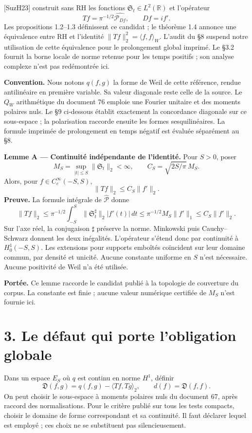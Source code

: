 \documentclass[
  11pt,
]{article}
\begin{document}
{[}SuzH23{]} construit sans RH les fonctions
\(\mathfrak S_t\in L^2(\mathbb R)\) et l'opérateur \[
T f=\pi^{-1/2}\widehat{\mathcal P_{Df}},\qquad Df=if'.
\] Les propositions 1.2--1.3 définissent ce candidat ; le théorème 1.4
annonce une équivalence entre RH et l'identité
\(\|Tf\|_2^2=\langle f,f\rangle_W\). L'audit du §8 suspend notre
utilisation de cette équivalence pour le prolongement global imprimé. Le
§3.2 fournit la borne locale de norme retenue pour les temps positifs ;
son analyse complexe n'est pas redémontrée ici.

\textbf{Convention.} Nous notons \(q(f,g)\) la forme de Weil de cette
référence, rendue antilinéaire en première variable. Sa valeur diagonale
reste celle de la source. Le \(Q_W\) arithmétique du document 76 emploie
une Fourier unitaire et des moments polaires nuls. Le §9 ci-dessous
établit exactement la concordance diagonale sur ce sous-espace ; la
polarisation raccorde ensuite les formes sesquilinéaires. La formule
imprimée de prolongement en temps négatif est évaluée séparément au §8.

\textbf{Lemme A --- Continuité indépendante de l'identité.} Pour
\(S>0\), poser \[
M_S=\sup_{|t|\le S}\|\mathfrak S_t\|_2<\infty,
\qquad C_S=\sqrt{2S/\pi}\,M_S.
\] Alors, pour \(f\in C_c^\infty(-S,S)\), \[
\boxed{\|Tf\|_2\le C_S\|f'\|_2.}
\] \textbf{Preuve.} La formule intégrale de \(\widehat{\mathcal P}\)
donne \[
\|Tf\|_2\le\pi^{-1/2}\int_{-S}^{S}
 \|\mathfrak S_t^\sharp\|_2|f'(t)|\,dt
\le\pi^{-1/2}M_S\|f'\|_1
\le C_S\|f'\|_2.
\] Sur l'axe réel, la conjugaison \(\sharp\) préserve la norme.
Minkowski puis Cauchy--Schwarz donnent les deux inégalités. L'opérateur
s'étend donc par continuité à \(H_0^1(-S,S)\). Les extensions pour
supports emboîtés coïncident sur leur domaine commun, par densité et
unicité. Aucune constante uniforme en \(S\) n'est nécessaire. Aucune
positivité de Weil n'a été utilisée.

\textbf{Portée.} Ce lemme raccorde le candidat publié à la topologie de
couverture du corpus. La constante est finie ; aucune valeur numérique
certifiée de \(M_S\) n'est fournie ici.

\hypertarget{le-duxe9faut-qui-porte-lobligation-globale}{%
\section{3. Le défaut qui porte l'obligation
globale}\label{le-duxe9faut-qui-porte-lobligation-globale}}

Dans un espace \(E_S\) où \(q\) est continu en norme \(H^1\), définir \[
\mathfrak D(f,g)=q(f,g)-\langle Tf,Tg\rangle_2,
\qquad d(f)=\mathfrak D(f,f).
\] On peut choisir le sous-espace à moments polaires nuls du document
67, après raccord des normalisations. Pour le critère publié sur tous
les tests compacts, choisir le domaine de forme correspondant et sa
continuité. Il faut déclarer lequel est employé ; ces choix ne se
substituent pas silencieusement.
\end{document}
